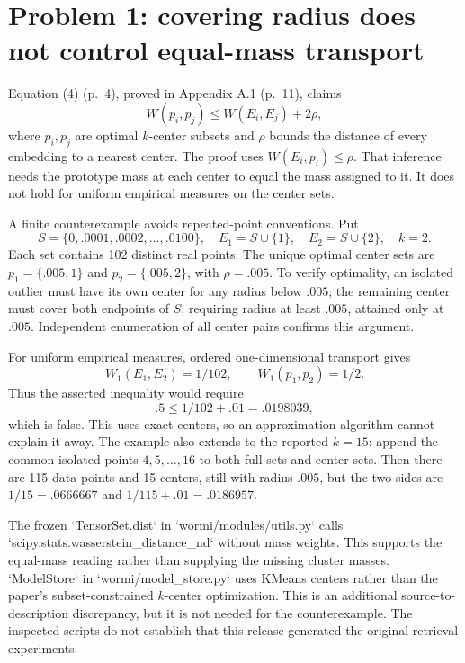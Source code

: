 \documentclass[10pt]{article}
\begin{document}
\section*{Problem 1: covering radius does not control equal-mass transport}
Equation (4) (p. 4), proved in Appendix A.1 (p. 11), claims \[W(p_i,p_j)\le W(E_i,E_j)+2\rho,\] where \(p_i,p_j\) are optimal \(k\)-center subsets and \(\rho\) bounds the distance of every embedding to a nearest center. The proof uses \(W(E_i,p_i)\le\rho\). That inference needs the prototype mass at each center to equal the mass assigned to it. It does not hold for uniform empirical measures on the center sets.\par
A finite counterexample avoids repeated-point conventions. Put \[S=\{0,.0001,.0002,\ldots,.0100\},\quad
 E_1=S\cup\{1\},\quad E_2=S\cup\{2\},\quad k=2.\] Each set contains 102 distinct real points. The unique optimal center sets are \(p_1=\{.005,1\}\) and \(p_2=\{.005,2\}\), with \(\rho=.005\). To verify optimality, an isolated outlier must have its own center for any radius below \(.005\); the remaining center must cover both endpoints of \(S\), requiring radius at least \(.005\), attained only at \(.005\). Independent enumeration of all center pairs confirms this argument.\par
For uniform empirical measures, ordered one-dimensional transport gives \[W_1(E_1,E_2)=1/102,\qquad W_1(p_1,p_2)=1/2.\] Thus the asserted inequality would require \[.5\le 1/102+.01=.0198039,\] which is false. This uses exact centers, so an approximation algorithm cannot explain it away. The example also extends to the reported \(k=15\): append the common isolated points \(4,5,\ldots,16\) to both full sets and center sets. Then there are 115 data points and 15 centers, still with radius \(.005\), but the two sides are \(1/15=.0666667\) and \(1/115+.01=.0186957\).\par
The frozen `TensorSet.dist` in `wormi/modules/utils.py` calls `scipy.stats.wasserstein\_distance\_nd` without mass weights. This supports the equal-mass reading rather than supplying the missing cluster masses. `ModelStore` in `wormi/model\_store.py` uses KMeans centers rather than the paper’s subset-constrained \(k\)-center optimization. This is an additional source-to-description discrepancy, but it is not needed for the counterexample. The inspected scripts do not establish that this release generated the original retrieval experiments.\par
\end{document}
